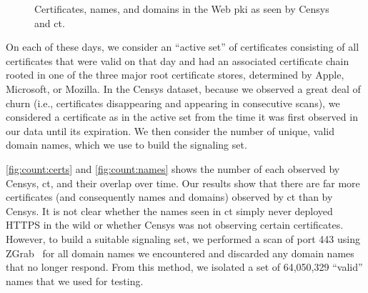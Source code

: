 \begin{figure}
  \centering
  \caption{Certificates, names, and domains in the Web \ac{pki} as seen by
  Censys and \ac{ct}. }
  \label{fig:count}
\end{figure}

On each of these days, we consider an ``active set'' of certificates consisting
of all certificates that were valid on that day and had an associated
certificate chain rooted in one of the three major root certificate stores,
determined by Apple, Microsoft, or Mozilla. In the Censys dataset, because we
observed a great deal of churn (i.e., certificates disappearing and appearing in
consecutive scans), we considered a certificate as in the active set from the
time it was first observed in our data until its expiration. We then consider
the number of unique, valid domain names, which we use to build the signaling
set.

\autoref{fig:count:certs} and \autoref{fig:count:names} shows the number of each
observed by Censys, \ac{ct}, and their overlap over time. Our results show that
there are far more certificates (and consequently names and domains) observed by
\ac{ct} than by Censys. It is not clear whether the names seen in \ac{ct} simply
never deployed HTTPS in the wild or whether Censys was not observing certain
certificates. However, to build a suitable signaling set, we performed a scan of
port 443 using ZGrab~\cite{durumeric2015search} for all domain names we
encountered and discarded any domain names that no longer respond. From this
method, we isolated a set of 64,050,329 ``valid'' names that we used for testing.

